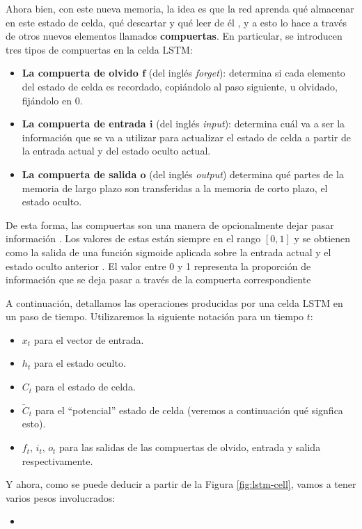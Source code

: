 \documentclass[../../main.tex]{subfiles}
\begin{document}
Ahora bien, con este nueva memoria, la idea es que la red aprenda qué almacenar en este
estado de celda, qué descartar y qué leer de él \cite{hands-on-ML-sklearn-tf}, y a esto lo
hace a través de otros nuevos elementos llamados \textbf{compuertas}. En particular,
se introducen tres tipos de compuertas en la celda LSTM:
\begin{itemize}
    \item \textbf{La compuerta de olvido \(\bm{f}\)} (del inglés \textit{forget}):
    determina si cada elemento del estado de celda es recordado, copiándolo al paso
    siguiente, u olvidado, fijándolo en 0.
    \item \textbf{La compuerta de entrada \(\bm{i}\)} (del inglés \textit{input}):
    determina cuál va a ser la información que se va a utilizar para actualizar
    el estado de celda a partir de la entrada actual y del estado oculto actual.
    \item \textbf{La compuerta de salida \(\bm{o}\)} (del inglés \textit{output})
    determina qué partes de la memoria de largo plazo son transferidas a la memoria
    de corto plazo, el estado oculto.
\end{itemize}

De esta forma, las compuertas son una manera de opcionalmente dejar pasar información
\cite{colahs-blog-lstm-2015}. Los valores de estas están siempre en el rango \([0,1]\) y
se obtienen como la salida de una función sigmoide aplicada sobre la entrada actual y el
estado oculto anterior \cite{ai-a-modern-approach}. El valor entre 0 y 1 representa
la proporción de información que se deja pasar a través de la compuerta correspondiente

A continuación, detallamos las operaciones producidas por una celda LSTM en un paso de
tiempo. Utilizaremos la siguiente notación para un tiempo \(t\):
\begin{itemize}
    \item \(x_t\) para el vector de entrada.
    \item \(h_t\) para el estado oculto.
    \item \(C_t\) para el estado de celda.
    \item \(\tilde{C}_t\) para el ``potencial'' estado de celda (veremos a continuación
    qué signfica esto).
    \item \(f_t\), \(i_t\), \(o_t\) para las salidas de las compuertas de olvido,
    entrada y salida respectivamente.
\end{itemize}

Y ahora, como se puede deducir a partir de la Figura \ref{fig:lstm-cell}, vamos a tener
varios pesos involucrados:
\begin{itemize}
    \item 
\end{itemize}
\end{document}
